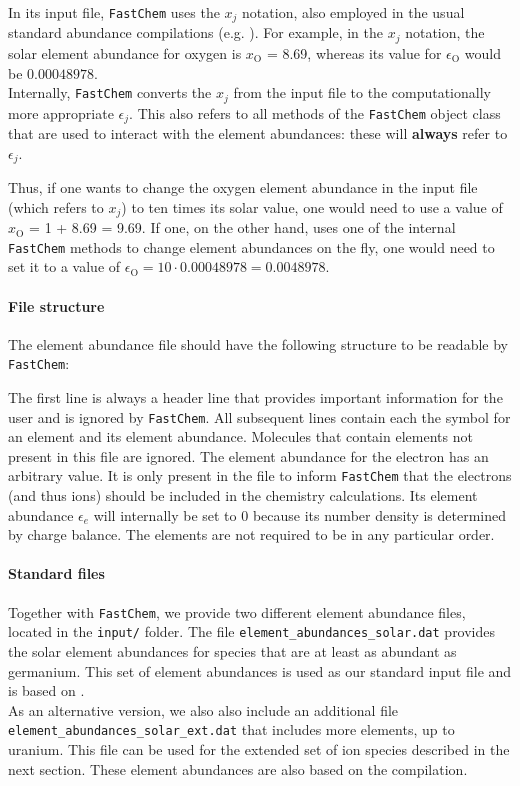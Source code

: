 \documentclass[numbers=noenddot]{aux/fcmanual}
\newcommand{\fc}{\texttt{FastChem}\xspace}
\begin{document}
In its input file, \fc uses the $x_j$ notation, also employed in the usual standard abundance compilations (e.g. \citet{Asplund2009ARA&A..47..481A}). For example, in the $x_j$ notation, the solar element abundance for oxygen is $x_\mathrm{O}$ = 8.69, whereas its value for $\epsilon_\mathrm{O}$ would be $0.00048978$.\\

Internally, \fc converts the $x_j$ from the input file to the computationally more appropriate $\epsilon_j$. This also refers to all methods of the \fc object class that are used to interact with the element abundances: these will \textbf{always} refer to $\epsilon_j$. 

Thus, if one wants to change the oxygen element abundance in the input file (which refers to $x_j$) to ten times its solar value, one would need to use a value of $x_\mathrm{O}$ = 1 + 8.69 = 9.69. If one, on the other hand, uses one of the internal \fc methods to change element abundances on the fly, one would need to set it to a value of $\epsilon_\mathrm{O} = 10 \cdot 0.00048978 =  0.0048978$.

\newpage
\paragraph{File structure}
The element abundance file should have the following structure to be readable by \fc:


The first line is always a header line that provides important information for the user and is ignored by \fc. All subsequent lines contain each the symbol for an element and its element abundance. Molecules that contain elements not present in this file are ignored. The element abundance for  the electron has an arbitrary value. It is only present in the file to inform \fc that the electrons (and thus ions) should be included in the chemistry calculations. Its element abundance $\epsilon_e$ will internally be set to 0 because its number density is determined by charge balance. The elements are not required to be in any particular order. 


\paragraph{Standard files}
Together with \fc, we provide two different element abundance files, located in the \verb|input/| folder. The file \verb|element_abundances_solar.dat| provides the solar element abundances for species that are at least as abundant as germanium. This set of element abundances is used as our standard input file and is based on \citet{Asplund2009ARA&A..47..481A}.\\
As an alternative version, we also also include an additional file \verb|element_abundances_solar_ext.dat| that includes more elements, up to uranium. This file can be used for the extended set of ion species described in the next section. These element abundances are also based on the \citet{Asplund2009ARA&A..47..481A} compilation.
\end{document}
